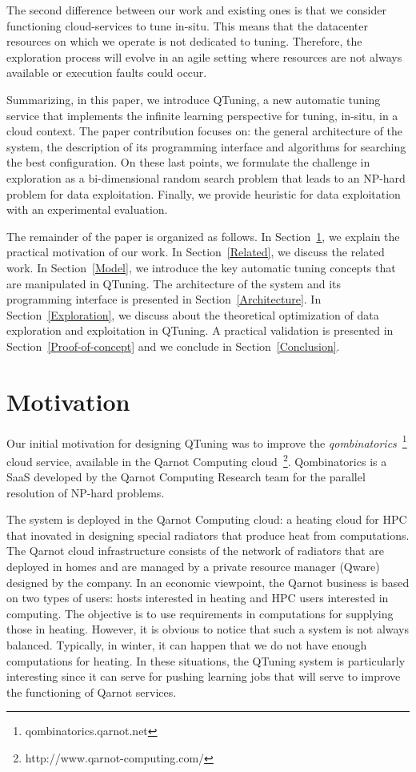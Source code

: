 \documentclass[10pt, conference, compsocconf]{IEEEtran}
\begin{document}
The second difference between our work and existing ones is that we consider functioning cloud-services to tune in-situ. 
This means that the datacenter resources on which we operate is not dedicated to tuning. Therefore, the exploration process will  
evolve in an agile setting where resources are not always available or execution faults could occur. 

Summarizing, in this paper, we introduce QTuning, a new automatic tuning service that implements the infinite learning perspective for 
tuning, in-situ, in a cloud context. The paper contribution focuses on: the general architecture of the system, the description of its 
programming interface and algorithms for searching the best configuration. 
On these last points, we formulate the challenge in exploration as a bi-dimensional random search problem that leads to 
an NP-hard problem for data exploitation. Finally, we provide heuristic for data exploitation with an experimental evaluation. 

The remainder of the paper is organized as follows. In Section~\ref{Motivation}, we explain the practical motivation of 
our work. In Section~\ref{Related}, we discuss the related work. 
In Section~\ref{Model}, we introduce the key automatic tuning concepts that are manipulated in QTuning. 
The architecture of the system and its programming interface is presented in Section~\ref{Architecture}. 
In Section~\ref{Exploration}, we discuss about the theoretical optimization of data exploration and exploitation in 
QTuning. A practical validation is presented in Section~\ref{Proof-of-concept} and we conclude in 
Section~\ref{Conclusion}.


\section{Motivation} \label{Motivation}

Our initial motivation for designing QTuning was to improve the {\it qombinatorics}~\footnote{qombinatorics.qarnot.net} 
cloud service, available in the Qarnot Computing cloud~\footnote{http://www.qarnot-computing.com/}. Qombinatorics is a SaaS 
developed by the Qarnot Computing Research team for the parallel resolution of NP-hard problems.

The system is deployed in the Qarnot Computing cloud: a heating cloud for HPC that inovated in designing special radiators that produce heat from computations. The Qarnot cloud infrastructure consists of the network of radiators that are deployed in homes and are managed by a private resource manager (Qware) designed by the company. 
In an economic viewpoint, the Qarnot business is based on two types of users: hosts interested in heating and HPC users interested 
in computing. The objective is to use requirements in computations for supplying those in heating.
However, it is obvious to notice that such a system is not always balanced. Typically, in winter, it can happen that we 
do not have enough computations for heating. In these situations, the QTuning system is particularly interesting since it 
can serve for pushing learning jobs that  will serve to improve the functioning of Qarnot services. 
\end{document}
